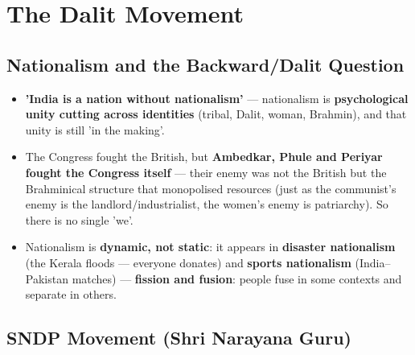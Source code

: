 \chapter{The Dalit Movement}

\section{Nationalism and the Backward/Dalit Question}

\begin{KeyConcept}
\begin{itemize}
\item \textbf{'India is a nation without nationalism'} --- nationalism is \textbf{psychological unity cutting across identities} (tribal, Dalit, woman, Brahmin), and that unity is still 'in the making'.
\item The Congress fought the British, but \textbf{Ambedkar, Phule and Periyar fought the Congress itself} --- their enemy was not the British but the Brahminical structure that monopolised resources (just as the communist's enemy is the landlord/industrialist, the women's enemy is patriarchy). So there is no single 'we'.
\item Nationalism is \textbf{dynamic, not static}: it appears in \textbf{disaster nationalism} (the Kerala floods --- everyone donates) and \textbf{sports nationalism} (India--Pakistan matches) --- \textbf{fission and fusion}: people fuse in some contexts and separate in others.
\end{itemize}
\end{KeyConcept}

\section{SNDP Movement (Shri Narayana Guru)}

